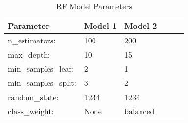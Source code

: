 \begin{table}[h]
\centering
\caption{RF Model Parameters}
\label{tab:rf-parameters}
\begin{tabular}{llllll}
\hline
Parameter & Model 1 & Model 2 \\ \hline
n\_estimators: & 100 & 200 \\
max\_depth: & 10 & 15  \\
min\_samples\_leaf: & 2 & 1  \\
min\_samples\_split: & 3 & 2  \\
random\_state: & 1234 & 1234 \\
class\_weight: & None & balanced \\ \hline
\end{tabular}
\end{table}

%
